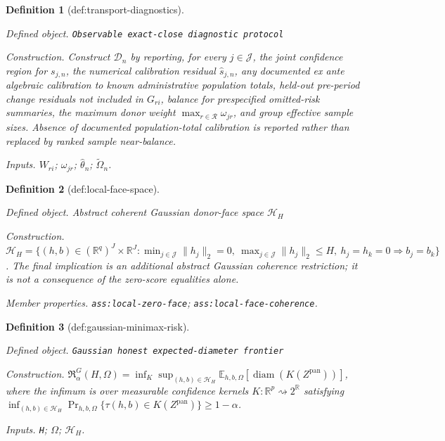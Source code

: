 \documentclass{article}
\newtheorem{definition}{Definition}
\begin{document}
\begin{definition}[def:transport-diagnostics]\label{def:transport-diagnostics}
\par\smallskip\noindent\emph{Defined object.} \texttt{Observable exact-\allowbreak{}close diagnostic protocol}
\par\smallskip\noindent\emph{Construction.} Construct \(\mathcal D_n\) by reporting, for every \(j\in\mathcal J\), the joint confidence region for \(s_{j,n}\), the numerical calibration residual \(\widehat s_{j,n}\), any documented ex ante algebraic calibration to known administrative population totals, held-out pre-period change residuals not included in \(G_{ri}\), balance for prespecified omitted-risk summaries, the maximum donor weight \(\max_{r\in\mathcal R}\omega_{jr}\), and group effective sample sizes. Absence of documented population-total calibration is reported rather than replaced by ranked sample near-balance.
\par\smallskip\noindent\emph{Inputs.} \(W_{ri}\); \(\omega_{jr}\); \(\widehat\theta_n\); \(\widetilde\Omega_n\).
\end{definition}

\begin{definition}[def:local-face-space]\label{def:local-face-space}
\par\smallskip\noindent\emph{Defined object.} Abstract coherent Gaussian donor-face space \(\mathcal H_H\)
\par\smallskip\noindent\emph{Construction.} \(\mathcal H_H=\{(h,b)\in(\mathbb R^q)^J\times\mathbb R^J:\min_{j\in\mathcal J}\lVert h_j\rVert_2=0,\ \max_{j\in\mathcal J}\lVert h_j\rVert_2\leq H,\ h_j=h_k=0\Rightarrow b_j=b_k\}\). The final implication is an additional abstract Gaussian coherence restriction; it is not a consequence of the zero-score equalities alone.
\par\smallskip\noindent\emph{Member properties.} \texttt{ass:\allowbreak{}local-\allowbreak{}zero-\allowbreak{}face}; \texttt{ass:\allowbreak{}local-\allowbreak{}face-\allowbreak{}coherence}.
\end{definition}

\begin{definition}[def:gaussian-minimax-risk]\label{def:gaussian-minimax-risk}
\par\smallskip\noindent\emph{Defined object.} \texttt{Gaussian honest expected-\allowbreak{}diameter frontier}
\par\smallskip\noindent\emph{Construction.} \(\mathfrak R_{\alpha}^{G}(H,\Omega)=\inf_K\sup_{(h,b)\in\mathcal H_H}\mathbb E_{h,b,\Omega}[\operatorname{diam}(K(Z^{\mathrm{pan}}))]\), where the infimum is over measurable confidence kernels \(K:\mathbb R^p\rightsquigarrow2^{\mathbb R}\) satisfying \(\inf_{(h,b)\in\mathcal H_H}\Pr_{h,b,\Omega}\{\tau(h,b)\in K(Z^{\mathrm{pan}})\}\ge1-\alpha\).
\par\smallskip\noindent\emph{Inputs.} \texttt{H}; \(\Omega\); \(\mathcal H_H\).
\end{definition}
\end{document}

